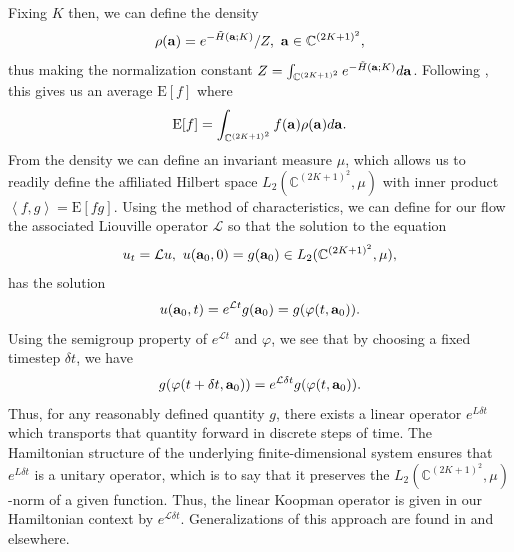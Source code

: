\documentclass[aps,prl,preprint,groupedaddress]{revtex4-1}
\begin{document}
Fixing $K$ then, we can define the density 
\[
\rho({\bf a}) = e^{-\tilde{H}({\bf a};K)}/Z, ~ {\bf a} \in \mathbb{C}^{(2K+1)^{2}},
\]
thus making the normalization constant $Z = \int_{\mathbb{C}^{(2K+1)^{2}}} e^{-\tilde{H}({\bf a};K)} d{\bf a}$.  Following \cite{chorin}, this gives us an average $\mbox{E}[f]$ where 
\[
\mbox{E}[f] = \int_{\mathbb{C}^{(2K+1)^{2}}} f({\bf a})\rho({\bf a})d{\bf a}.
\]
From the density we can define an invariant measure $\mu$, which allows us to readily define the affiliated Hilbert space $L_{2}(\mathbb{C}^{(2K+1)^{2}},\mu)$ with inner product $\left<f,g\right> = \mbox{E}[fg]$. Using the method of characteristics, we can define for our flow the associated Liouville operator $\mathcal{L}$ so that the solution to the equation
\[
u_{t} = \mathcal{L}u, ~ u({\bf a}_{0},0) = g({\bf a}_{0}) \in L_{2}(\mathbb{C}^{(2K+1)^{2}},\mu),
\]
has the solution
\[
u({\bf a}_{0},t) = e^{\mathcal{L}t}g({\bf a}_{0}) = g(\varphi(t,{\bf a}_{0})).  
\]
Using the semigroup property of $e^{\mathcal{L}t}$ and $\varphi$, we see that by choosing a fixed timestep $\delta t$, we have 
\[
g(\varphi(t+\delta t,{\bf a}_{0}))= e^{\mathcal{L}\delta t} g(\varphi(t,{\bf a}_{0})).
\]
Thus, for any reasonably defined quantity $g$, there exists a linear operator $e^{L\delta t}$ which transports that quantity forward in discrete steps of time.  The Hamiltonian structure of the underlying finite-dimensional system ensures that $e^{L\delta t}$ is a unitary operator, which is to say that it preserves the $L_{2}(\mathbb{C}^{(2K+1)^{2}},\mu)$-norm of a given function. Thus, the linear Koopman operator is given in our Hamiltonian context by $e^{\mathcal{L}\delta t}$.  Generalizations of this approach are found in \cite{mezic1,williams,kutz} and elsewhere.  
\end{document}
